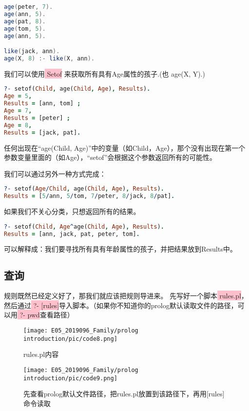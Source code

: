 \documentclass[a4paper, 11pt]{article}
\begin{document}
\begin{lstlisting}[language={java}]
age(peter, 7).
age(ann, 5).
age(pat, 8).
age(tom, 5).
age(ann, 5).

like(jack, ann).
age(X, 8) :- like(X, ann).
\end{lstlisting}

我们可以使用\colorbox{pink}{\color{black} Setof} 来获取所有具有Age属性的孩子.(也 age(X, Y).)
\begin{lstlisting}[language={prolog}]
?- setof(Child, age(Child, Age), Results).
Age = 5,
Results = [ann, tom] ;
Age = 7,
Results = [peter] ;
Age = 8,
Results = [jack, pat].
\end{lstlisting}

任何出现在“age(Child, Age)”中的变量（如Child，Age），那个没有出现在第一个参数变量里面的（如Age），“setof”会根据这个参数返回所有的可能性。

我们可以通过另外一种方式完成：
\begin{lstlisting}[language={prolog}]
?- setof(Age/Child, age(Child, Age), Results).
Results = [5/ann, 5/tom, 7/peter, 8/jack, 8/pat].
\end{lstlisting}

如果我们不关心分类，只想返回所有的结果。
\begin{lstlisting}[language={prolog}]
?- setof(Child, Age^age(Child, Age), Results).
Results = [ann, jack, pat, peter, tom].
\end{lstlisting}

可以解释成：我们要寻找所有具有年龄属性的孩子，并把结果放到Results中。



\subsection{查询}
规则既然已经定义好了，那我们就应该把规则导进来。
先写好一个脚本\colorbox{pink}{\color{black} rules.pl}，然后通过\colorbox{pink}{\color{black} ?- [rules]}导入脚本。（如果你不知道你的prolog默认读取文件的路径，可以用\colorbox{pink}{\color{black} ?- pwd}查看路径）

\begin{figure}[H]
\centering
\texttt{[image: E05\_2019096\_Family/prolog introduction/pic/code8.png]}
\caption{rules.pl内容}
\end{figure}

\begin{figure}[H]
\centering
\texttt{[image: E05\_2019096\_Family/prolog introduction/pic/code9.png]}
\label{fig:label}
\caption{先查看prolog默认文件路径，把rules.pl放置到该路径下，再用[rules]命令读取}
\end{figure}
\end{document}
